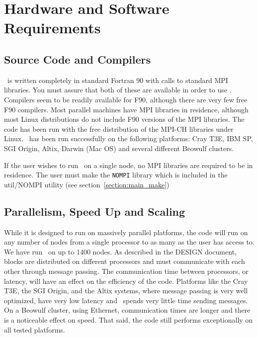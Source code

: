 \section{Hardware and Software Requirements \label{section:requirements}}

\subsection{Source Code and Compilers \label{section:compiler}}

\BATSRUS\ is written completely in standard Fortran 90 with calls to
standard MPI libraries.  You must assure that both of these are available
in order to
use \BATSRUS.  Compilers seem to be readily available for
F90, although there are very few free F90 compilers.  Most parallel
machines have MPI libraries in residence, although most Linux
distributions do not include F90 versions of the MPI libraries.  The
code has been run with the free distribution of the MPI-CH libraries
under Linux. \BATSRUS\ has been run successfully on the following platforms:
Cray T3E, IBM SP, SGI Origin, Altix, Darwin (Mac OS) and several
different Beowulf clusters.

If the user wishes to run \BATSRUS\ on a single node, no MPI libraries
are required to be in residence.  The user must make the {\tt NOMPI}
library which is included in the util/NOMPI utility
(see section~\ref{section:main_make})

\subsection{Parallelism, Speed Up and Scaling \label{scaling}}

While it is designed to run on massively parallel platforms, the
code will run on any number of nodes from a single processor to as
many as the user has access to. We have run \BATSRUS\ on up
to 1400 nodes.  As described in the DESIGN document,
blocks are distributed on different
processors and must communicate with each other through message passing.
The communication time between processors, or latency, will have an 
effect on the efficiency of the code.  Platforms like the Cray T3E, 
the SGI Origin, and the Altix systems,
where message passing is very well optimized, have very low latency and
\BATSRUS\ spends very little time sending messages.  On a Beowulf cluster,
using Ethernet, communication times are longer and there is a noticeable
effect on speed.  That said, the code still performs exceptionally on
all tested platforms.

